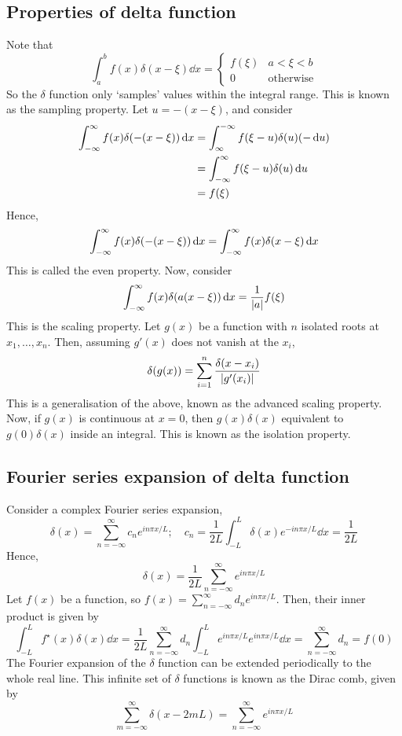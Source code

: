 \subsection{Properties of delta function}
Note that
\[
	\int_a^b f(x) \delta(x-\xi) \dd{x} = \begin{cases}
		f(\xi) & a < \xi < b      \\
		0      & \text{otherwise}
	\end{cases}
\]
So the \( \delta \) function only `samples' values within the integral range.
This is known as the sampling property.
Let \( u = -(x-\xi) \), and consider
\begin{align*}
	\int_{-\infty}^\infty f(x) \delta\qty(-(x-\xi)) \dd{x} & = \int_{\infty}^{-\infty} f(\xi - u) \delta(u) (-\dd{u}) \\
	                                                       & = \int_{-\infty}^\infty f(\xi - u) \delta(u) \dd{u}      \\
	                                                       & = f(\xi)
\end{align*}
Hence,
\[
	\int_{-\infty}^\infty f(x) \delta\qty(-(x-\xi)) \dd{x} = \int_{-\infty}^\infty f(x) \delta(x-\xi) \dd{x}
\]
This is called the even property.
Now, consider
\[
	\int_{-\infty}^\infty f(x) \delta(a(x-\xi)) \dd{x} = \frac{1}{\abs{a}}f(\xi)
\]
This is the scaling property.
Let \( g(x) \) be a function with \( n \) isolated roots at \( x_1, \dots, x_n \).
Then, assuming \( g'(x) \) does not vanish at the \( x_i \),
\[
	\delta(g(x)) = \sum_{i=1}^n \frac{\delta(x - x_i)}{\abs{g'(x_i)}}
\]
This is a generalisation of the above, known as the advanced scaling property.
Now, if \( g(x) \) is continuous at \( x = 0 \), then \( g(x) \delta(x) \) equivalent to \( g(0) \delta(x) \) inside an integral.
This is known as the isolation property.

\subsection{Fourier series expansion of delta function}
Consider a complex Fourier series expansion,
\[
	\delta(x) = \sum_{n=-\infty}^\infty c_n e^{in\pi x/L};\quad c_n = \frac{1}{2L}\int_{-L}^L \delta(x) e^{-i n \pi x / L} \dd{x} = \frac{1}{2L}
\]
Hence,
\[
	\delta(x) = \frac{1}{2L} \sum_{n=-\infty}^\infty e^{in\pi x/L}
\]
Let \( f(x) \) be a function, so \( f(x) = \sum_{n=-\infty}^\infty d_n e^{in \pi x / L} \).
Then, their inner product is given by
\[
	\int_{-L}^L f^\star(x) \delta(x) \dd{x} = \frac{1}{2L} \sum_{n = -\infty}^\infty d_n \int_{-L}^L e^{in \pi x/L} e^{in \pi x/L} \dd{x} = \sum_{n = -\infty}^\infty d_n = f(0)
\]
The Fourier expansion of the \( \delta \) function can be extended periodically to the whole real line.
This infinite set of \( \delta \) functions is known as the Dirac comb, given by
\[
	\sum_{m = -\infty}^\infty \delta(x-2mL) = \sum_{n = -\infty}^\infty e^{in \pi x/L}
\]

